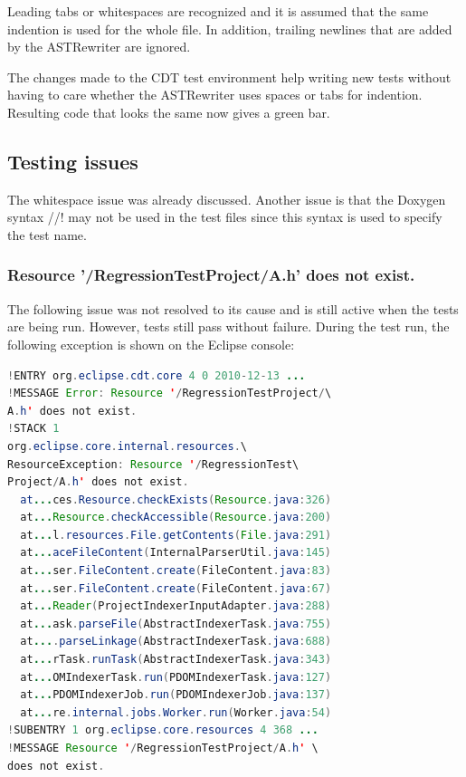 Leading tabs or whitespaces are recognized and it is assumed that the same
indention is used for the whole file. In addition, trailing newlines that are
added by the ASTRewriter are ignored.

The changes made to the CDT test environment help writing new tests without
having to care whether the ASTRewriter uses spaces or tabs for indention.
Resulting code that looks the same now gives a green bar.

\subsection{Testing issues}

The whitespace issue was already discussed. Another issue is that the Doxygen 
syntax //! may not be used in the test files since this syntax is used to 
specify the test name.

\subsubsection{Resource '/RegressionTestProject/A.h' does not exist.}

The following issue was not resolved to its cause and is still active when the 
tests are being run. However, tests still pass without failure. During the test 
run, the following exception is shown on the Eclipse console:

\begin{lstlisting}[language=java]
!ENTRY org.eclipse.cdt.core 4 0 2010-12-13 ...
!MESSAGE Error: Resource '/RegressionTestProject/\
A.h' does not exist.
!STACK 1
org.eclipse.core.internal.resources.\
ResourceException: Resource '/RegressionTest\
Project/A.h' does not exist.
  at...ces.Resource.checkExists(Resource.java:326)
  at...Resource.checkAccessible(Resource.java:200)
  at...l.resources.File.getContents(File.java:291)
  at...aceFileContent(InternalParserUtil.java:145)
  at...ser.FileContent.create(FileContent.java:83)
  at...ser.FileContent.create(FileContent.java:67)
  at...Reader(ProjectIndexerInputAdapter.java:288)
  at...ask.parseFile(AbstractIndexerTask.java:755)
  at....parseLinkage(AbstractIndexerTask.java:688)
  at...rTask.runTask(AbstractIndexerTask.java:343)
  at...OMIndexerTask.run(PDOMIndexerTask.java:127)
  at...PDOMIndexerJob.run(PDOMIndexerJob.java:137)
  at...re.internal.jobs.Worker.run(Worker.java:54)
!SUBENTRY 1 org.eclipse.core.resources 4 368 ...
!MESSAGE Resource '/RegressionTestProject/A.h' \
does not exist.
\end{lstlisting}

